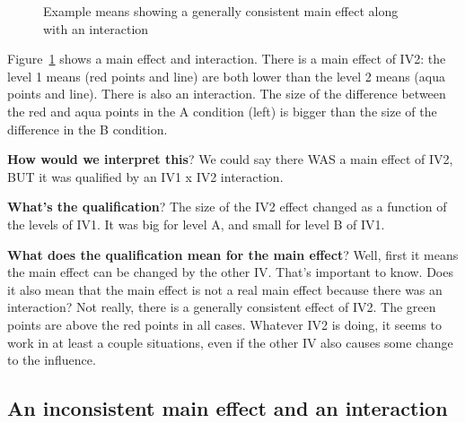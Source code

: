 \documentclass[
  letterpaper,
  DIV=11,
  numbers=noendperiod]{scrreprt}
\begin{document}
\begin{figure}


\caption{\label{fig-11mainint}Example means showing a generally
consistent main effect along with an interaction}

\end{figure}%

Figure~\ref{fig-11mainint} shows a main effect and interaction. There is
a main effect of IV2: the level 1 means (red points and line) are both
lower than the level 2 means (aqua points and line). There is also an
interaction. The size of the difference between the red and aqua points
in the A condition (left) is bigger than the size of the difference in
the B condition.

\textbf{How would we interpret this}? We could say there WAS a main
effect of IV2, BUT it was qualified by an IV1 x IV2 interaction.

\textbf{What's the qualification}? The size of the IV2 effect changed as
a function of the levels of IV1. It was big for level A, and small for
level B of IV1.

\textbf{What does the qualification mean for the main effect}? Well,
first it means the main effect can be changed by the other IV. That's
important to know. Does it also mean that the main effect is not a real
main effect because there was an interaction? Not really, there is a
generally consistent effect of IV2. The green points are above the red
points in all cases. Whatever IV2 is doing, it seems to work in at least
a couple situations, even if the other IV also causes some change to the
influence.

\subsection{An inconsistent main effect and an
interaction}\label{an-inconsistent-main-effect-and-an-interaction}
\end{document}
